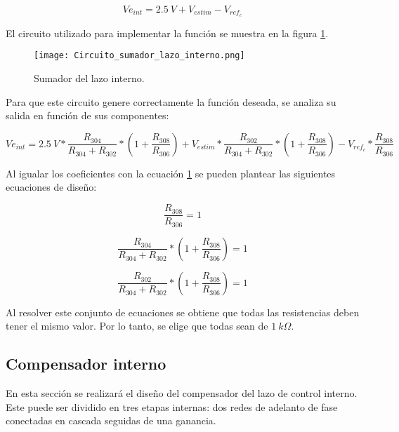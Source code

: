 \begin{equation}
	Ve_{int}=2.5\:V+V_{estim}-V_{ref_c}
\end{equation}

El circuito utilizado para implementar la función se muestra en la figura \ref{fig:circuito-sumador-lazo-interno}. 

\begin{figure}[H]
	\centering
	\texttt{[image: Circuito\_sumador\_lazo\_interno.png]}
	\caption{Sumador del lazo interno.}
	\label{fig:circuito-sumador-lazo-interno}
\end{figure}

Para que este circuito genere correctamente la función deseada, se analiza su salida en función de sus componentes:

\begin{equation*}
	Ve_{int}=2.5\:V*\frac{R_{304}}{R_{304}+R_{302}}*(1+\frac{R_{308}}{R_{306}})+V_{estim}*\frac{R_{302}}{R_{304}+R_{302}}*(1+\frac{R_{308}}{R_{306}})-V_{ref_c}*\frac{R_{308}}{R_{306}}
\end{equation*}

Al igualar los coeficientes con la ecuación \ref{fig:circuito-sumador-lazo-interno} se pueden plantear las siguientes ecuaciones de diseño:

\begin{equation}
	\frac{R_{308}}{R_{306}}=1
\end{equation}

\begin{equation}
	\frac{R_{304}}{R_{304}+R_{302}}*(1+\frac{R_{308}}{R_{306}})=1
\end{equation}

\begin{equation}
	\frac{R_{302}}{R_{304}+R_{302}}*(1+\frac{R_{308}}{R_{306}})=1
\end{equation}

Al resolver este conjunto de ecuaciones se obtiene que todas las resistencias deben tener el mismo valor. Por lo tanto, se elige que todas sean de $1\:k\Omega$.

\subsection{Compensador interno}

En esta sección se realizará el diseño del compensador del lazo de control interno. Este puede ser dividido en tres etapas internas: dos redes de adelanto de fase conectadas en cascada seguidas de una ganancia.


